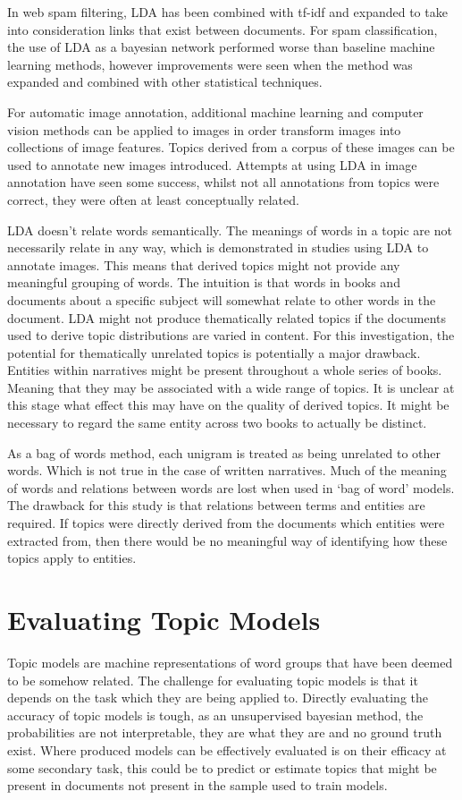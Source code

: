 \documentclass[10pt]{report}
\begin{document}
In web spam filtering, LDA has been combined with tf-idf and expanded to take into consideration links that exist between documents. For spam classification, the use of LDA as a bayesian network performed worse than baseline machine learning methods, however improvements were seen when the method was expanded and combined with other statistical techniques.~\cite{Biro2008-ld}

For automatic image annotation, additional machine learning and computer vision methods can be applied to images in order transform images into collections of image features. Topics derived from a corpus of these images can be used to annotate new images introduced. Attempts at using LDA in image annotation have seen some success, whilst not all annotations from topics were correct, they were often at least conceptually related.~\cite{Feng2010-dp, Zhang2011-dn}

LDA doesn’t relate words semantically. The meanings of words in a topic are not necessarily relate in any way, which is demonstrated in studies using LDA to annotate images. This means that derived topics might not provide any meaningful grouping of words. The intuition is that words in books and documents about a specific subject will somewhat relate to other words in the document. LDA might not produce thematically related topics if the documents used to derive topic distributions are varied in content. For this investigation, the potential for thematically unrelated topics is potentially a major drawback. Entities within narratives might be present throughout a whole series of books. Meaning that they may be associated with a wide range of topics. It is unclear at this stage what effect this may have on the quality of derived topics. It might be necessary to regard the same entity across two books to actually be distinct.

As a bag of words method, each unigram is treated as being unrelated to other words. Which is not true in the case of written narratives. Much of the meaning of words and relations between words are lost when used in ‘bag of word’ models. The drawback for this study is that relations between terms and entities are required. If topics were directly derived from the documents which entities were extracted from, then there would be no meaningful way of identifying how these topics apply to entities.

\section{Evaluating Topic Models}
Topic models are machine representations of word groups that have been deemed to be somehow related. The challenge for evaluating topic models is that it depends on the task which they are being applied to. Directly evaluating the accuracy of topic models is tough, as an unsupervised bayesian method, the probabilities are not interpretable, they are what they are and no ground truth exist. Where produced models can be effectively evaluated is on their efficacy at some secondary task, this could be to predict or estimate topics that might be present in documents not present in the sample used to train models.
\end{document}
